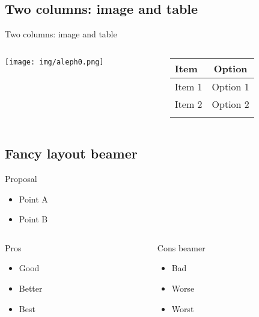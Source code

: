 \documentclass[
  ignorenonframetext,
  aspectratio=169,
  aspectratio=169]{beamer}
\providecommand{\tightlist}{%
  \setlength{\itemsep}{0pt}\setlength{\parskip}{0pt}}
\providecommand{\tightlist}{%
  \setlength{\itemsep}{0pt}\setlength{\parskip}{0pt}}
\begin{document}
\subsection{Two columns: image and
table}\label{two-columns-image-and-table}

\begin{frame}{Two columns: image and table}
\begin{columns}[T]
\begin{column}{0.48\textwidth}
\texttt{[image: img/aleph0.png]}
\end{column}

\begin{column}{0.48\textwidth}
\begin{longtable}[]{@{}lc@{}}
\toprule\noalign{}
\textbf{Item} & \textbf{Option} \\
\midrule\noalign{}
\endhead
Item 1 & Option 1 \\
Item 2 & Option 2 \\
\bottomrule\noalign{}
\end{longtable}
\end{column}
\end{columns}
\end{frame}

\subsection{Fancy layout beamer}\label{fancy-layout-beamer}

\begin{frame}{Proposal}
\label{proposal}
\begin{itemize}
\tightlist
\item
  Point A
\item
  Point B
\end{itemize}
\end{frame}

\begin{columns}[T]
\begin{column}{0.48\textwidth}
\begin{frame}{Pros}
\label{pros}
\begin{itemize}
\tightlist
\item
  Good
\item
  Better
\item
  Best
\end{itemize}
\end{frame}
\end{column}

\begin{column}{0.48\textwidth}
\begin{frame}{Cons beamer}
\label{cons-beamer}
\begin{itemize}
\tightlist
\item
  Bad
\item
  Worse
\item
  Worst
\end{itemize}
\end{frame}
\end{column}
\end{columns}
\end{document}
